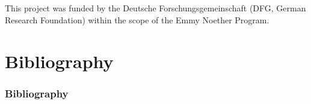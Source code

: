 \documentclass[10pt,xcolor=dvipsnames]{beamer}
\begin{document}

\begin{frame}[c]
  \frametitle{$ $}
  \begin{center}
  \end{center}
  \vspace{2\baselineskip}
  \justifying This project was funded by the Deutsche Forschungsgemeinschaft (DFG, German Research Foundation) within the scope of the Emmy Noether Program.
\end{frame}


\section{Bibliography}
\begin{frame}[t,allowframebreaks]

\nocite{Miller1981}
\frametitle{Bibliography}
\sloppy
\printbibliography[heading=none]

\end{frame}
\end{document}
